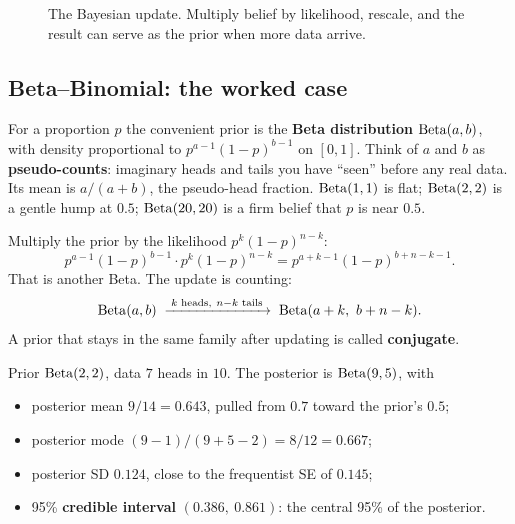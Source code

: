 \begin{figure}[H]
\centering
{}
\caption{The Bayesian update. Multiply belief by likelihood, rescale, and the result can
serve as the prior when more data arrive.}
\label{fig:lik-bayes-flow}
\end{figure}

\subsection{Beta--Binomial: the worked case}

For a proportion $p$ the convenient prior is the \textbf{Beta distribution}
$\operatorname{Beta}(a,b)$, with density proportional to $p^{a-1}(1-p)^{b-1}$ on $[0,1]$. Think of $a$
and $b$ as \textbf{pseudo-counts}: imaginary heads and tails you have ``seen'' before any
real data. Its mean is $a/(a+b)$, the pseudo-head fraction. $\operatorname{Beta}(1,1)$ is flat;
$\operatorname{Beta}(2,2)$ is a gentle hump at $0.5$; $\operatorname{Beta}(20,20)$ is a firm belief that $p$ is near
$0.5$.

Multiply the prior by the likelihood $p^k(1-p)^{n-k}$:
\[
  p^{a-1}(1-p)^{b-1}\cdot p^k(1-p)^{n-k} = p^{a+k-1}(1-p)^{b+n-k-1} .
\]
That is another Beta. The update is counting:
\[
  \operatorname{Beta}(a,b) \;\xrightarrow{\;k \text{ heads},\ n-k \text{ tails}\;}\; \operatorname{Beta}(a+k,\ b+n-k).
\]
A prior that stays in the same family after updating is called \textbf{conjugate}.

\begin{example}
Prior $\operatorname{Beta}(2,2)$, data $7$ heads in $10$. The posterior is $\operatorname{Beta}(9,5)$, with
\begin{itemize}
  \item posterior mean $9/14 = 0.643$, pulled from $0.7$ toward the prior's $0.5$;
  \item posterior mode $(9-1)/(9+5-2) = 8/12 = 0.667$;
  \item posterior SD $0.124$, close to the frequentist SE of $0.145$;
  \item 95\% \textbf{credible interval} $(0.386,\ 0.861)$: the central 95\% of the
        posterior.
\end{itemize}
\end{example}


